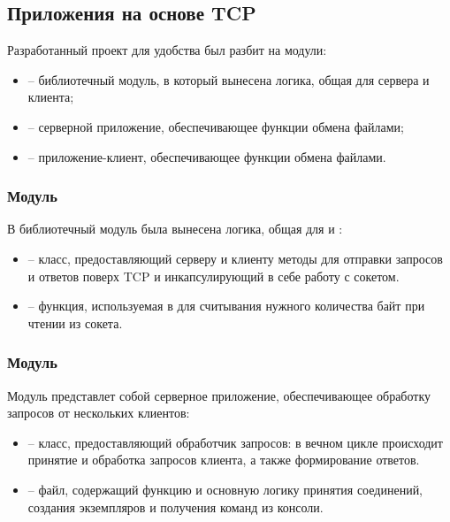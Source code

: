 \subsection{Приложения на основе TCP}

Разработанный проект  для удобства был разбит на модули:
\begin{itemize}
	\item {} -- библиотечный модуль, в который вынесена логика, общая для сервера и клиента;
	\item {} -- серверной приложение, обеспечивающее функции обмена файлами;
	\item {} -- приложение-клиент, обеспечивающее функции обмена файлами.
\end{itemize}

\subsubsection{Модуль }

В библиотечный модуль  была вынесена логика, общая для  и :
\begin{itemize}
	\item {} -- класс, предоставляющий серверу и клиенту методы для отправки запросов и ответов поверх TCP и инкапсулирующий в себе работу с сокетом.
	\item {} -- функция, используемая в  для считывания нужного количества байт при чтении из сокета.

\end{itemize}

\subsubsection{Модуль }

Модуль  представлет собой серверное приложение, обеспечивающее обработку запросов от нескольких клиентов:
\begin{itemize}
	\item {} -- класс, предоставляющий обработчик запросов: в вечном цикле происходит принятие и обработка запросов клиента, а также формирование ответов.
	\item {} -- файл, содержащий функцию  и основную логику принятия соединений, создания экземпляров  и получения команд из консоли.
\end{itemize}

